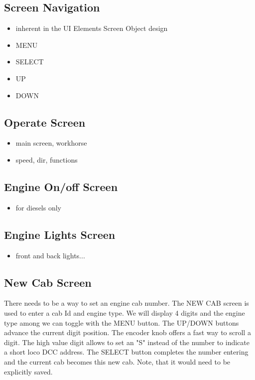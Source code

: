\subsection{Screen Navigation}

\begin{itemize}
\item inherent in the UI Elements Screen Object design
\item MENU
\item SELECT
\item UP
\item DOWN
\end{itemize}

\subsection{Operate Screen}

\begin{itemize}
\item main screen, workhorse
\item speed, dir, functions
\end{itemize}

\subsection{Engine On/off Screen}

\begin{itemize}
\item for diesels only
\end{itemize}

\subsection{Engine Lights Screen}

\begin{itemize}
\item front and back lights...
\end{itemize}

\subsection{New Cab Screen}

There needs to be a way to set an engine cab number. The NEW CAB screen is used to enter a cab Id and engine type. We will display 4 digits and the engine type among we can toggle with the MENU button. The UP/DOWN buttons advance the current digit position. The encoder knob offers a fast way to scroll a digit. The high value digit allows to set an "S" instead of the number to indicate a short loco DCC address. The SELECT button completes the number entering and the current cab becomes this new cab. Note, that it would need to be explicitly saved.

